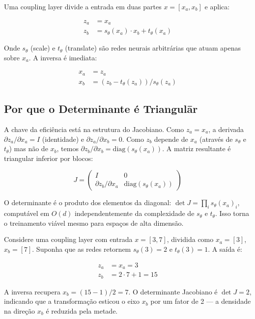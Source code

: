 \documentclass{tufte-handout}
\let\subsubsection\subsection
\begin{document}
\begin{defn}
Uma coupling layer divide a entrada em duas partes $x = [x_a, x_b]$ e aplica:

\begin{align}
z_a &= x_a \\
z_b &= s_\theta(x_a) \cdot x_b + t_\theta(x_a)
\end{align}

Onde $s_\theta$ (scale) e $t_\theta$ (translate) são redes neurais arbitrárias que atuam apenas sobre $x_a$. A inversa é imediata:

\begin{align}
x_a &= z_a \\
x_b &= (z_b - t_\theta(z_a)) / s_\theta(z_a)
\end{align}
\end{defn}

\subsubsection{Por que o Determinante é Triangul\={a}r}

A chave da eficiência está na estrutura do Jacobiano. Como $z_a = x_a$, a derivada $\partial z_a / \partial x_a = I$ (identidade) e $\partial z_a / \partial x_b = 0$. Como $z_b$ depende de $x_a$ (através de $s_\theta$ e $t_\theta$) mas não de $x_b$, temos $\partial z_b / \partial x_b = \text{diag}(s_\theta(x_a))$. A matriz resultante é triangular inferior por blocos:

\begin{equation}
J = \begin{pmatrix}
I & 0 \\
\partial z_b / \partial x_a & \text{diag}(s_\theta(x_a))
\end{pmatrix}
\end{equation}

O determinante é o produto dos elementos da diagonal: $\det J = \prod_i s_\theta(x_a)_i$, computável em $O(d)$ independentemente da complexidade de $s_\theta$ e $t_\theta$. Isso torna o treinamento viável mesmo para espaços de alta dimensão.

\begin{exmp}
Considere uma coupling layer com entrada $x = [3, 7]$, dividida como $x_a = [3]$, $x_b = [7]$. Suponha que as redes retornem $s_\theta(3) = 2$ e $t_\theta(3) = 1$. A saída é:

\begin{align}
z_a &= x_a = 3 \\
z_b &= 2 \cdot 7 + 1 = 15
\end{align}

A inversa recupera $x_b = (15 - 1) / 2 = 7$. O determinante Jacobiano é $\det J = 2$, indicando que a transformação esticou o eixo $x_b$ por um fator de 2 --- a densidade na direção $x_b$ é reduzida pela metade.
\end{exmp}
\end{document}

